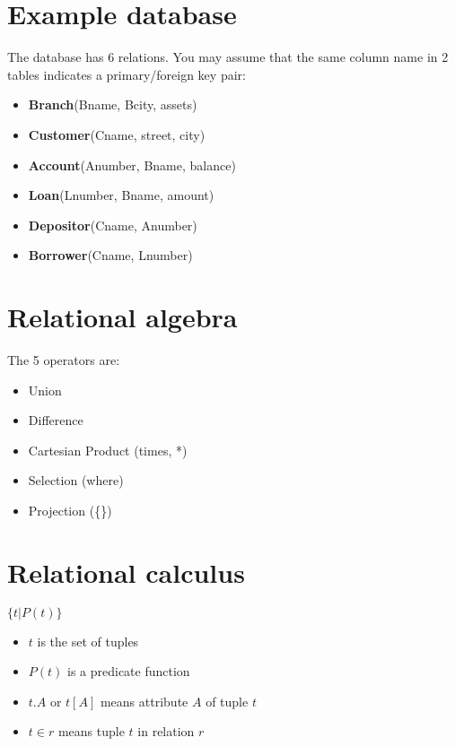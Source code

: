 \documentclass[
  14pt,
]{extarticle}
\author{}
\date{}
\providecommand{\tightlist}{%
  \setlength{\itemsep}{0pt}\setlength{\parskip}{0pt}}
\begin{document}
\hypertarget{example-database}{%
\section{Example database}\label{example-database}}

The database has 6 relations. You may assume that the same column name
in 2 tables indicates a primary/foreign key pair:

\begin{itemize}
\tightlist
\item
  \textbf{Branch}(Bname, Bcity, assets)
\item
  \textbf{Customer}(Cname, street, city)
\item
  \textbf{Account}(Anumber, Bname, balance)
\item
  \textbf{Loan}(Lnumber, Bname, amount)
\item
  \textbf{Depositor}(Cname, Anumber)
\item
  \textbf{Borrower}(Cname, Lnumber)
\end{itemize}

\newpage

\hypertarget{relational-algebra}{%
\section{Relational algebra}\label{relational-algebra}}

The 5 operators are:

\begin{itemize}
\tightlist
\item
  Union
\item
  Difference
\item
  Cartesian Product (times, *)
\item
  Selection (where)
\item
  Projection (\{\})
\end{itemize}

\hypertarget{relational-calculus}{%
\section{Relational calculus}\label{relational-calculus}}

\(\{t | P(t)\}\)

\begin{itemize}
\tightlist
\item
  \(t\) is the set of tuples
\item
  \(P(t)\) is a predicate function
\item
  \(t.A\) or \(t[A]\) means attribute \(A\) of tuple \(t\)
\item
  \(t \in r\) means tuple \(t\) in relation \(r\)
\end{itemize}
\end{document}
